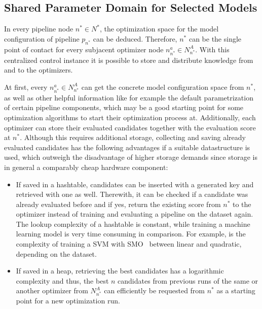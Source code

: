 \subsection{Shared Parameter Domain for Selected Models}
\label{sec:appraoch:configuration:parameter}
In every pipeline node $n^* \in N^*$, the optimization space for the model configuration of pipeline $p_{n^*}$ can be deduced.
Therefore, $n^*$ can be the single point of contact for every subjacent optimizer node $n^{a}_{n^*} \in N^A_{n^*}$.
With this centralized control instance it is possible to store and distribute knowledge from and to the optimizers.

At first, every $n^{a}_{n^*} \in N^A_{n^*}$ can get the concrete model configuration space from $n^*$, as well as other helpful information like for example the default parametrization of certain pipeline components, which may be a good starting point for some optimization algorithms to start their optimization process at.
Additionally, each optimizer can store their evaluated candidates together with the evaluation score at $n^*$.
Although this requires additional storage, collecting and saving already evaluated candidates has the following advantages if a suitable datastructure is used, which outweigh the disadvantage of higher storage demands since storage is in general a comparably cheap hardware component:
\begin{itemize}
    \item If saved in a hashtable, candidates can be inserted with a generated key and retrieved with one as well. Therewith, it can be checked if a candidate was already evaluated before and if yes, return the existing score from $n^*$ to the optimizer instead of training and evaluating a pipeline on the dataset again.
    The lookup complexity of a hashtable is constant, while training a machine learning model is very time consuming in comparison.
    For example, is the complexity of training a SVM with SMO~\cite{Platt-SMO} between linear and quadratic, depending on the dataset.
    \item If saved in a heap, retrieving the best candidates has a logarithmic complexity and thus, the best $n$ candidates from previous runs of the same or another optimizer from $N^A_{n^*}$ can efficiently be requested from $n^*$ as a starting point for a new optimization run.
\end{itemize}

